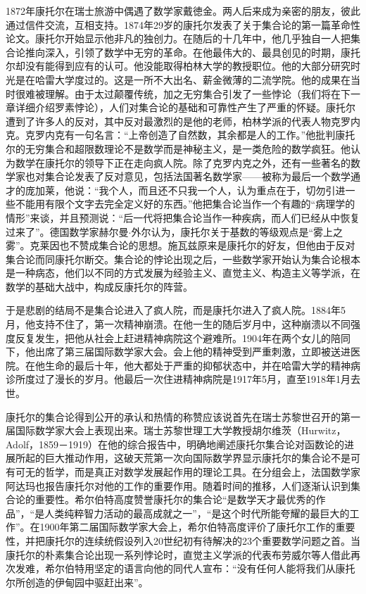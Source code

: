 \documentclass{article}
\begin{document}
1872年康托尔在瑞士旅游中偶遇了数学家戴徳金。两人后来成为亲密的朋友，彼此通过信件交流，互相支持。1874年29岁的康托尔发表了关于集合论的第一篇革命性论文。康托尔开始显示他非凡的独创力。在随后的十几年中，他几乎独自一人把集合论推向深入，引领了数学中无穷的革命。在他最伟大的、最具创见的时期，康托尔却没有能得到应有的认可。他没能取得柏林大学的教授职位。他的大部分研究时光是在哈雷大学度过的。这是一所不大出名、薪金微薄的二流学院。他的成果在当时很难被理解。由于太过颠覆传统，加之无穷集合引发了一些悖论（我们将在下一章详细介绍罗素悖论），人们对集合论的基础和可靠性产生了严重的怀疑。康托尔遭到了许多人的反对，其中反对最激烈的是他的老师，柏林学派的代表人物克罗内克。克罗内克有一句名言：“上帝创造了自然数，其余都是人的工作。”他批判康托尔的无穷集合和超限数理论不是数学而是神秘主义，是一类危险的数学疯狂。他认为数学在康托尔的领导下正在走向疯人院。除了克罗内克之外，还有一些著名的数学家也对集合论发表了反对意见，包括法国著名数学家——被称为最后一个数学通才的庞加莱，他说：“我个人，而且还不只我一个人，认为重点在于，切勿引进一些不能用有限个文字去完全定义好的东西。”他把集合论当作一个有趣的“病理学的情形”来谈，并且预测说：“后一代将把集合论当作一种疾病，而人们已经从中恢复过来了”。德国数学家赫尔曼$\cdot$外尔认为，康托尔关于基数的等级观点是“雾上之雾”。克莱因也不赞成集合论的思想。施瓦兹原来是康托尔的好友，但他由于反对集合论而同康托尔断交。集合论的悖论出现之后，一些数学家开始认为集合论根本是一种病态，他们以不同的方式发展为经验主义、直觉主义、构造主义等学派，在数学的基础大战中，构成反康托尔的阵营。

于是悲剧的结局不是集合论进入了疯人院，而是康托尔进入了疯人院。1884年5月，他支持不住了，第一次精神崩溃。在他一生的随后岁月中，这种崩溃以不同强度反复发生，把他从社会上赶进精神病院这个避难所。1904年在两个女儿的陪同下，他出席了第三届国际数学家大会。会上他的精神受到严重刺激，立即被送进医院。在他生命的最后十年，他大都处于严重的抑郁状态中，并在哈雷大学的精神病诊所度过了漫长的岁月。他最后一次住进精神病院是1917年5月，直至1918年1月去世。

康托尔的集合论得到公开的承认和热情的称赞应该说首先在瑞士苏黎世召开的第一届国际数学家大会上表现出来。瑞士苏黎世理工大学教授胡尔维茨（Hurwitz，Adolf，1859－1919）在他的综合报告中，明确地阐述康托尔集合论对函数论的进展所起的巨大推动作用，这破天荒第一次向国际数学界显示康托尔的集合论不是可有可无的哲学，而是真正对数学发展起作用的理论工具。在分组会上，法国数学家阿达玛也报告康托尔对他的工作的重要作用。随着时间的推移，人们逐渐认识到集合论的重要性。希尔伯特高度赞誉康托尔的集合论“是数学天才最优秀的作品”，“是人类纯粹智力活动的最高成就之一”，“是这个时代所能夸耀的最巨大的工作”。在1900年第二届国际数学家大会上，希尔伯特高度评价了康托尔工作的重要性，并把康托尔的连续统假设列入20世纪初有待解决的23个重要数学问题之首。当康托尔的朴素集合论出现一系列悖论时，直觉主义学派的代表布劳威尔等人借此再次发难，希尔伯特用坚定的语言向他的同代人宣布：“没有任何人能将我们从康托尔所创造的伊甸园中驱赶出来”。
\end{document}
